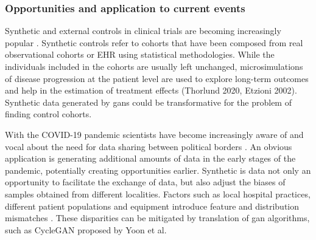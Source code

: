 \subsubsection{Opportunities and application to current events}
Synthetic and external controls in clinical trials are becoming increasingly popular \cite{Thorlund2020}. Synthetic controls refer to cohorts that have been composed from real observational cohorts or EHR using statistical methodologies. While the individuals included in the cohorts are usually left unchanged, microsimulations of disease progression at the patient level are used to explore long-term outcomes and help in the estimation of treatment effects (Thorlund 2020, Etzioni 2002). Synthetic data generated by \glspl{gan} could be transformative for the problem of finding control cohorts.\par
With the COVID-19 pandemic scientists have become increasingly aware of and vocal about the need for data sharing between political borders \cite{Cosgriff_2020,Becker_2020,McLennan_2020}. An obvious application is generating additional amounts of data in the early stages of the pandemic, potentially creating opportunities earlier. Synthetic is data not only an opportunity to facilitate the exchange of data, but also adjust the biases of samples obtained from different localities. Factors such as local hospital practices, different patient populations and equipment introduce feature and distribution mismatches \cite{Ghassemi2020}. These disparities can be mitigated by translation of \gls{gan} algorithms, such as CycleGAN proposed by Yoon et al.


